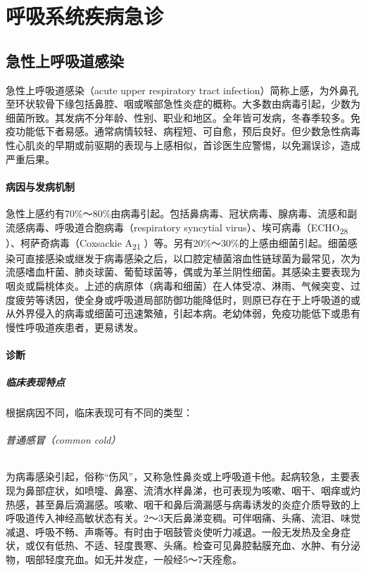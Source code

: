 \part{呼吸系统疾病急诊}

\chapter{急性上呼吸道感染}

急性上呼吸道感染（acute upper respiratory tract
infection）简称上感，为外鼻孔至环状软骨下缘包括鼻腔、咽或喉部急性炎症的概称。大多数由病毒引起，少数为细菌所致。其发病不分年龄、性别、职业和地区。全年皆可发病，冬春季较多。免疫功能低下者易感。通常病情较轻、病程短、可自愈，预后良好。但少数急性病毒性心肌炎的早期或前驱期的表现与上感相似，首诊医生应警惕，以免漏误诊，造成严重后果。

\subsection{病因与发病机制}

急性上感约有70\%～80\%由病毒引起。包括鼻病毒、冠状病毒、腺病毒、流感和副流感病毒、呼吸道合胞病毒（respiratory
syncytial virus）、埃可病毒（ECHO\textsubscript{28}
）、柯萨奇病毒（Coxsackie A\textsubscript{21}
）等。另有20\%～30\%的上感由细菌引起。细菌感染可直接感染或继发于病毒感染之后，以口腔定植菌溶血性链球菌为最常见，次为流感嗜血杆菌、肺炎球菌、葡萄球菌等，偶或为革兰阴性细菌。其感染主要表现为咽炎或扁桃体炎。上述的病原体（病毒和细菌）在人体受凉、淋雨、气候突变、过度疲劳等诱因，使全身或呼吸道局部防御功能降低时，则原已存在于上呼吸道的或从外界侵入的病毒或细菌可迅速繁殖，引起本病。老幼体弱，免疫功能低下或患有慢性呼吸道疾患者，更易诱发。

\subsection{诊断}

\subsubsection{临床表现特点}

根据病因不同，临床表现可有不同的类型：

\paragraph{普通感冒（common cold）}

为病毒感染引起，俗称“伤风”，又称急性鼻炎或上呼吸道卡他。起病较急，主要表现为鼻部症状，如喷嚏、鼻塞、流清水样鼻涕，也可表现为咳嗽、咽干、咽痒或灼热感，甚至鼻后滴漏感。咳嗽、咽干和鼻后滴漏感与病毒诱发的炎症介质导致的上呼吸道传入神经高敏状态有关。2～3天后鼻涕变稠。可伴咽痛、头痛、流泪、味觉减退、呼吸不畅、声嘶等。有时由于咽鼓管炎使听力减退。一般无发热及全身症状，或仅有低热、不适、轻度畏寒、头痛。检查可见鼻腔黏膜充血、水肿、有分泌物，咽部轻度充血。如无并发症，一般经5～7天痊愈。

